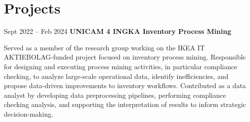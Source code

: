 \section{Projects}
    
    \begin{twocolentry}{Sept 2022 – Feb 2024}
        \textbf{UNICAM 4 INGKA Inventory Process Mining}
    \end{twocolentry}
    \vspace{0.10 cm}
    \begin{onecolentry}
        Served as a member of the research group working on the IKEA IT AKTIEBOLAG-funded project focused on inventory process mining. Responsible for designing and executing process mining activities, in particular compliance checking, to analyze large-scale operational data, identify inefficiencies, and propose data-driven improvements to inventory workflows. Contributed as a data analyst by developing data preprocessing pipelines, performing compliance checking analysis, and supporting the interpretation of results to inform strategic decision-making.
    \end{onecolentry}